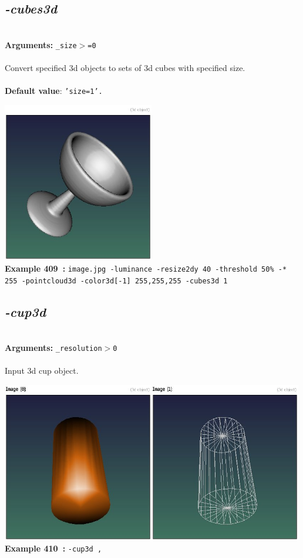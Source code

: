 \documentclass[a4paper,11pt,twoside]{book}
\begin{document}
\subsection{\emph{-cubes3d} }\vspace*{-0.5em}
~\\\textbf{Arguments: } 
{\small \texttt{\_size$>$=0}}\\~\\
Convert specified 3d objects to sets of 3d cubes with specified size.
~\\~\\\textbf{Default value}: {\small \texttt{'size=1'.}}
\begin{center}\includegraphics[keepaspectratio=true,height=7cm,width=\textwidth]{img/gmic_def409.jpg}\\
{\footnotesize \textbf{Example 409~:} \texttt{image.jpg -luminance -resize2dy 40 -threshold 50\% -* 255 -pointcloud3d -color3d[-1] 255,255,255 -cubes3d 1}}
\end{center}

\subsection{\emph{-cup3d} }\vspace*{-0.5em}
~\\\textbf{Arguments: } 
{\small \texttt{\_resolution$>$0}}\\~\\
Input 3d cup object.
\begin{center}\includegraphics[keepaspectratio=true,height=7cm,width=\textwidth]{img/gmic_def410.jpg}\\
{\footnotesize \textbf{Example 410~:} \texttt{-cup3d ,}}
\end{center}
\end{document}
